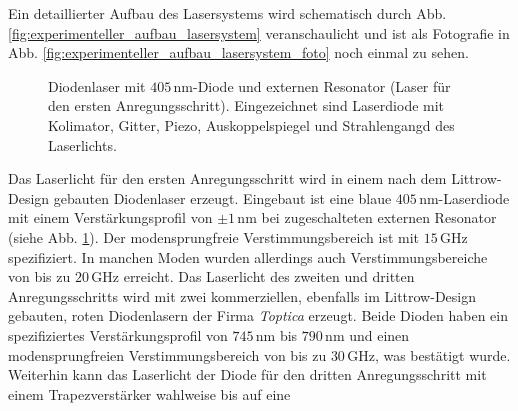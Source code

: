 Ein detaillierter Aufbau des Lasersystems wird schematisch durch Abb.
\ref{fig:experimenteller_aufbau_lasersystem} veranschaulicht und ist als
Fotografie in Abb. \ref{fig:experimenteller_aufbau_lasersystem_foto} noch einmal
zu sehen.\par
\begin{figure}[h]
 	\centering
	\caption[Diodenlaser - Foto]{Diodenlaser mit
	$405\,$nm-Diode und externen
	Resonator (Laser für den ersten
	Anregungsschritt).
	Eingezeichnet sind
	Laserdiode mit Kolimator,
	Gitter, Piezo,
	Auskoppelspiegel und
	Strahlengangd des
	Laserlichts.}\label{fig:experimenteller_aufbau_diodenlaser_foto}
\end{figure}
Das Laserlicht für den ersten Anregungsschritt wird in einem nach dem
Littrow-Design gebauten Diodenlaser erzeugt. Eingebaut ist eine blaue
$405\,$nm-Laserdiode mit einem Verstärkungsprofil von $\pm1\,$nm bei
zugeschalteten externen Resonator (siehe Abb.
\ref{fig:experimenteller_aufbau_diodenlaser_foto}). Der modensprungfreie Verstimmungsbereich ist mit $15\,$GHz spezifiziert. In manchen Moden wurden allerdings auch Verstimmungsbereiche
von bis zu $20\,$GHz erreicht. Das Laserlicht des zweiten und dritten
Anregungsschritts wird mit zwei kommerziellen, ebenfalls im Littrow-Design
gebauten, roten Diodenlasern der Firma \textit{Toptica} erzeugt.
Beide Dioden haben ein spezifiziertes Verstärkungsprofil von
$745\,$nm bis $790\,$nm und einen modensprungfreien Verstimmungsbereich von bis
zu $30\,$GHz, was bestätigt wurde. Weiterhin kann das Laserlicht der Diode für
den dritten Anregungsschritt mit einem Trapezverstärker wahlweise bis auf eine
